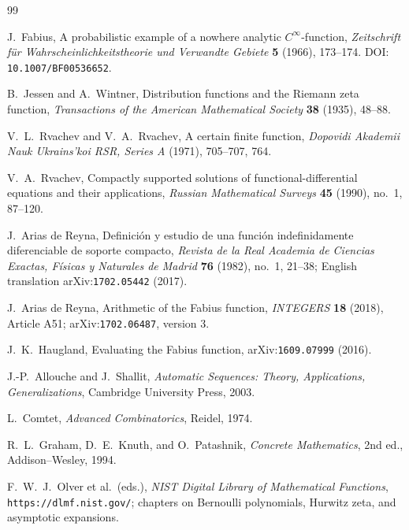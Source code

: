 \begin{thebibliography}{99}

J.~Fabius,
\newblock A probabilistic example of a nowhere analytic
$C^\infty$-function,
\newblock \emph{Zeitschrift f\"ur Wahrscheinlichkeitstheorie und
Verwandte Gebiete} \textbf{5} (1966), 173--174.
DOI: \nolinkurl{10.1007/BF00536652}.

B.~Jessen and A.~Wintner,
\newblock Distribution functions and the Riemann zeta function,
\newblock \emph{Transactions of the American Mathematical Society}
\textbf{38} (1935), 48--88.

V.~L.~Rvachev and V.~A.~Rvachev,
\newblock A certain finite function,
\newblock \emph{Dopovidi Akademii Nauk Ukrains'koi RSR, Series A}
(1971), 705--707, 764.

V.~A.~Rvachev,
\newblock Compactly supported solutions of functional-differential
equations and their applications,
\newblock \emph{Russian Mathematical Surveys} \textbf{45} (1990),
no.~1, 87--120.

J.~Arias de Reyna,
\newblock Definici\'on y estudio de una funci\'on indefinidamente
diferenciable de soporte compacto,
\newblock \emph{Revista de la Real Academia de Ciencias Exactas,
F\'isicas y Naturales de Madrid} \textbf{76} (1982), no.~1, 21--38;
English translation arXiv:\nolinkurl{1702.05442} (2017).

J.~Arias de Reyna,
\newblock Arithmetic of the Fabius function,
\newblock \emph{INTEGERS} \textbf{18} (2018), Article A51;
arXiv:\nolinkurl{1702.06487}, version 3.

J.~K.~Haugland,
\newblock Evaluating the Fabius function,
\newblock arXiv:\nolinkurl{1609.07999} (2016).

J.-P.~Allouche and J.~Shallit,
\newblock \emph{Automatic Sequences: Theory, Applications,
Generalizations},
\newblock Cambridge University Press, 2003.

L.~Comtet,
\newblock \emph{Advanced Combinatorics},
\newblock Reidel, 1974.

R.~L.~Graham, D.~E.~Knuth, and O.~Patashnik,
\newblock \emph{Concrete Mathematics}, 2nd ed.,
\newblock Addison--Wesley, 1994.

F.~W.~J.~Olver et al.\ (eds.),
\newblock \emph{NIST Digital Library of Mathematical Functions},
\newblock \nolinkurl{https://dlmf.nist.gov/}; chapters on Bernoulli
polynomials, Hurwitz zeta, and asymptotic expansions.


\end{thebibliography}
